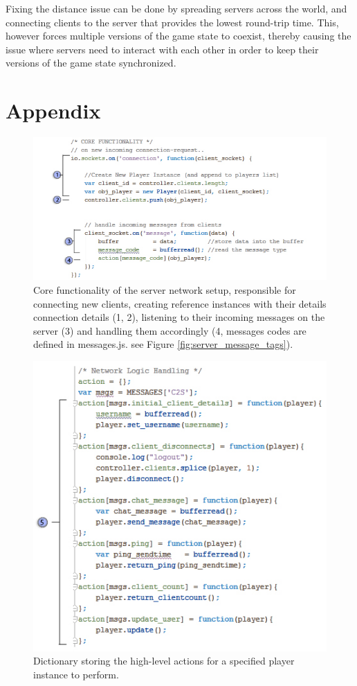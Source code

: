 \documentclass[bsc, 12pt, twoside, singlespacing, parskip, abbrevs, notimes, normalheadings, logo]{styles/infthesis}
\begin{document}
Fixing the distance issue can be done by spreading servers across the world, and connecting clients to the server that provides the lowest round-trip time. This, however forces multiple versions of the game state to coexist, thereby causing the issue where servers need to interact with each other in order to keep their versions of the game state synchronized.

\chapter{Appendix}
\begin{figure}
\includegraphics[scale=0.72]{images/server_code.jpg}
\caption{Core functionality of the server network setup, responsible for connecting new clients, creating reference instances with their details connection details (1, 2), listening to their incoming messages on the server (3) and handling them accordingly (4, messages codes are defined in messages.js. see Figure \ref{fig:server_message_tags}). }
\label{fig:server_core}
\end{figure}

\begin{figure}
\includegraphics[scale=0.65]{images/server_actions.jpg}
\caption{Dictionary storing the high-level actions for a specified player instance to perform.}
\label{fig:server_actions}
\end{figure}
\end{document}
